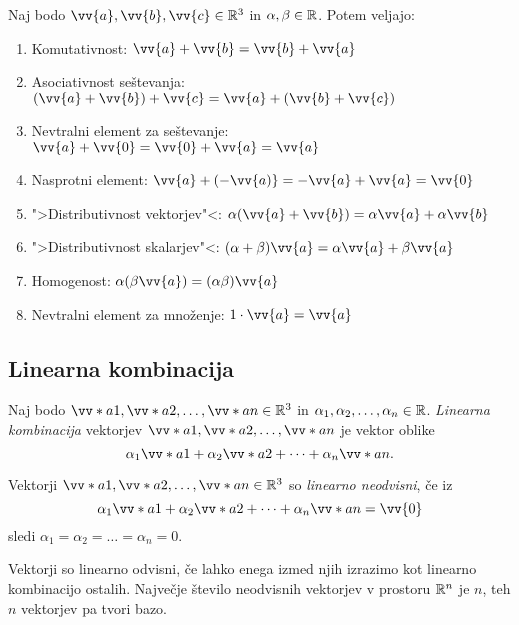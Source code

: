 \documentclass[12pt, a4paper]{article}
\begin{document}
\begin{opomba}
Naj bodo $\vv{a},\vv{b},\vv{c}\in\R^3$ in $\alpha,\beta\in\mathbb{R}$. Potem veljajo:

\begin{enumerate}[label=\roman*)]
\item Komutativnost: $\vv{a}+\vv{b}=\vv{b}+\vv{a}$
\item Asociativnost seštevanja: $(\vv{a}+\vv{b})+\vv{c}=\vv{a}+(\vv{b}+\vv{c})$
\item Nevtralni element za seštevanje: $\vv{a}+\vv{0}=\vv{0}+\vv{a}=\vv{a}$
\item Nasprotni element: $\vv{a}+(-\vv{a)}=-\vv{a}+\vv{a}=\vv{0}$
\item ">Distributivnost vektorjev"<: $\alpha(\vv{a}+\vv{b})=\alpha\vv{a}+\alpha\vv{b}$
\item ">Distributivnost skalarjev"<: $(\alpha+\beta)\vv{a}=\alpha\vv{a}+\beta\vv{a}$
\item Homogenost: $\alpha(\beta\vv{a})=(\alpha\beta)\vv{a}$
\item Nevtralni element za množenje: $1\cdot\vv{a}=\vv{a}$
\end{enumerate}
\end{opomba}

\newpage

\subsection{Linearna kombinacija}

\begin{okvir}
\begin{definicija}
Naj bodo $\vv*{a}{1},\vv*{a}{2},\dots,\vv*{a}{n}\in\R^3$ in $\alpha_1,\alpha_2,\dots,\alpha_n\in\mathbb{R}$. \emph{Linearna kombinacija} vektorjev $\vv*{a}{1},\vv*{a}{2},\dots,\vv*{a}{n}$ je vektor oblike
\[
\alpha_1\vv*{a}{1}+\alpha_2\vv*{a}{2}+\dots+\alpha_n\vv*{a}{n}.
\]
\end{definicija}
\end{okvir}

\begin{definicija}
Vektorji $\vv*{a}{1},\vv*{a}{2},\dots,\vv*{a}{n}\in\R^3$ so \emph{linearno neodvisni}, če iz
\[
\alpha_1\vv*{a}{1}+\alpha_2\vv*{a}{2}+\dots+\alpha_n\vv*{a}{n}=\vv{0}
\]
sledi $\alpha_1=\alpha_2=\dots=\alpha_n=0$. 
\end{definicija}

\begin{posledica}
Vektorji so linearno odvisni, če lahko enega izmed njih izrazimo kot linearno kombinacijo ostalih. Največje število neodvisnih vektorjev v prostoru $\mathbb{R}^n$ je $n$, teh $n$ vektorjev pa tvori bazo.
\end{posledica}
\end{document}
